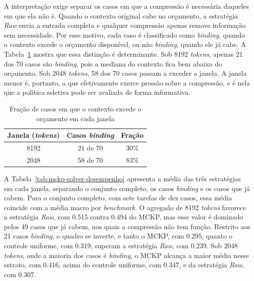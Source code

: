 A interpretação exige separar os casos em que a compressão é necessária daqueles em que ela não é. Quando o contexto original cabe no orçamento, a estratégia \textit{Raw} envia a entrada completa e qualquer compressão apenas remove informação sem necessidade. Por esse motivo, cada caso é classificado como \textit{binding}, quando o contexto excede o orçamento disponível, ou não \textit{binding}, quando ele já cabe. A Tabela~\ref{tab:mckp-binding} mostra que essa distinção é determinante. Sob 8192 \textit{tokens}, apenas 21 dos 70 casos são \textit{binding}, pois a mediana do contexto fica bem abaixo do orçamento. Sob 2048 \textit{tokens}, 58 dos 70 casos passam a exceder a janela. A janela menor é, portanto, a que efetivamente exerce pressão sobre a compressão, e é nela que a política seletiva pode ser avaliada de forma informativa.

\begin{table}[htbp]
\centering
\caption{Fração de casos em que o contexto excede o orçamento em cada janela}
\label{tab:mckp-binding}
\begin{tabular}{ccc}
\toprule
\textbf{Janela (\textit{tokens})} & \textbf{Casos \textit{binding}} & \textbf{Fração} \\
\midrule
8192 & 21 de 70 & 30\% \\
2048 & 58 de 70 & 83\% \\
\bottomrule
\end{tabular}
\end{table}

A Tabela~\ref{tab:mckp-solver-desempenho} apresenta a média das três estratégias em cada janela, separando o conjunto completo, os casos \textit{binding} e os casos que já cabem. Para o conjunto completo, com sete tarefas de dez casos, essa média coincide com a média macro por \textit{benchmark}. O agregado de 8192 \textit{tokens} favorece a estratégia \textit{Raw}, com 0.515 contra 0.494 do MCKP, mas esse valor é dominado pelos 49 casos que já cabem, nos quais a compressão não tem função. Restrito aos 21 casos \textit{binding}, o quadro se inverte, e tanto o MCKP, com 0.295, quanto o controle uniforme, com 0.319, superam a estratégia \textit{Raw}, com 0.239. Sob 2048 \textit{tokens}, onde a maioria dos casos é \textit{binding}, o MCKP alcança a maior média nesse estrato, com 0.416, acima do controle uniforme, com 0.347, e da estratégia \textit{Raw}, com 0.307.

